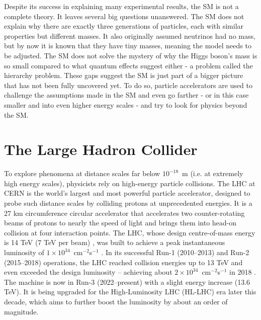 Despite its success in explaining many experimental results, the SM is not a complete theory. It leaves several big questions unanswered. The SM does not explain why there are exactly three generations of particles, each with similar properties but different masses. It also originally assumed neutrinos had no mass, but by now it is known that they have tiny masses, meaning the model needs to be adjusted.
The SM does not solve the mystery of why the Higgs boson’s mass is so small compared to what quantum effects suggest either - a problem called the hierarchy problem. These gaps suggest the SM is just part of a bigger picture that has not been fully uncovered yet. To do so, particle accelerators are used to challenge the assumptions made in the SM and even go farther - or in this case smaller and into even higher energy scales - and try to look for physics beyond the SM.

\section{The Large Hadron Collider}

To explore phenomena at distance scales far below $10^{-18}$ m (i.e. at extremely high energy scales), physicists rely on high-energy particle collisions. The LHC at CERN is the world’s largest and most powerful particle accelerator, designed to probe such distance scales by colliding protons at unprecedented energies. It is a 27 km circumference circular accelerator that accelerates two counter-rotating beams of protons to nearly the speed of light and brings them into head-on collision at four interaction points. The LHC, whose design centre-of-mass energy is 14 TeV (7 TeV per beam) \cite{Evans:2008zzb}, was built to achieve a peak instantaneous luminosity of $1\times10^{34}$ cm$^{-2}$s$^{-1}$ \cite{Evans:2008zzb}. In its successful Run-1 (2010–2013) and Run-2 (2015–2018) operations, the LHC reached collision energies up to 13 TeV and even exceeded the design luminosity – achieving about $2\times10^{34}$ cm$^{-2}$s$^{-1}$ in 2018 \cite{Hayrapetyan_2024}. The machine is now in Run-3 (2022–present) with a slight energy increase (13.6 TeV). It is being upgraded for the High-Luminosity LHC (HL-LHC) era later this decade, which aims to further boost the luminosity by about an order of magnitude.

